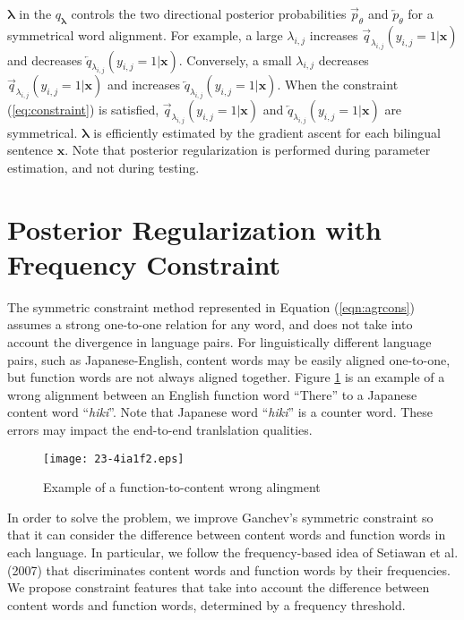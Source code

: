 \documentclass[english]{jnlp_1.4}
\begin{document}
$\boldsymbol{\lambda}$ in the $q_{\boldsymbol{\lambda}}$ controls the two directional posterior probabilities $\overrightarrow{p}_{\theta}$ and $\overleftarrow{p}_{\theta}$ for a symmetrical word alignment.
For example, a large $\lambda_{i,j}$ increases $\overrightarrow{q}_{\lambda_{i,j}}(y_{i,j}=1|\boldsymbol{x})$ and decreases $\overleftarrow{q}_{\lambda_{i,j}}(y_{i,j}=1|\boldsymbol{x})$.
Conversely, a small $\lambda_{i,j}$ decreases $\overrightarrow{q}_{\lambda_{i,j}}(y_{i,j}=1|\boldsymbol{x})$ and increases $\overleftarrow{q}_{\lambda_{i,j}}(y_{i,j}=1|\boldsymbol{x})$.
When the constraint (\ref{eq:constraint}) is satisfied, $\overrightarrow{q}_{\lambda_{i,j}}(y_{i,j}=1|\boldsymbol{x})$ and $\overleftarrow{q}_{\lambda_{i,j}}(y_{i,j}=1|\boldsymbol{x})$ are symmetrical.
$\boldsymbol{\lambda}$ is efficiently estimated by the gradient ascent for each bilingual sentence $\boldsymbol{x}$.
Note that posterior regularization is performed during parameter estimation, and not during testing.


\section{Posterior Regularization with Frequency Constraint}
\label{sec:proposed}

The symmetric constraint method represented in Equation (\ref{eqn:agrcons}) assumes a strong one-to-one relation for any word, and does not take into account the divergence in language pairs.
For linguistically different language pairs, such as Japanese-English,  content words may be easily aligned one-to-one, but function words are not always aligned together.
Figure \ref{fig:ex1} is an example of a wrong alignment between an English function word ``There'' to a Japanese content word ``\textit{hiki}''.
Note that Japanese word ``\textit{hiki}'' is a counter word.
These errors may impact the end-to-end tranlslation qualities.

\begin{figure}[t]
\begin{center}
\texttt{[image: 23-4ia1f2.eps]}
\end{center}
  \caption{Example of a function-to-content wrong alingment}
  \label{fig:ex1}
\end{figure}

In order to solve the problem, we improve Ganchev's symmetric constraint so that it can consider the difference between content words and function words in each language.
In particular, we follow the frequency-based idea of Setiawan et al. (2007) that discriminates content words and function words by their frequencies.
We propose constraint features that take into account the difference between content words and function words, determined by a frequency threshold.
\end{document}
